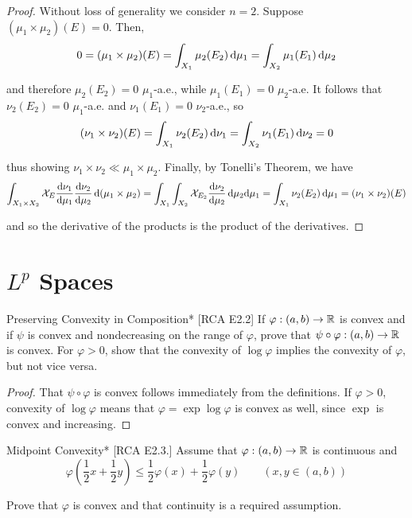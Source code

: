 \begin{proof}
    Without loss of generality we consider $n=2$. Suppose $(\mu_1 \times \mu_2)(E) = 0$. Then, 
    $$
        0 
        = (\mu_1 \times \mu_2)(E) 
        = \int_{X_1} \mu_2(E_2) \, \mathrm{d}\mu_1
        = \int_{X_2} \mu_1(E_1) \, \mathrm{d}\mu_2
    $$

    and therefore $\mu_2(E_2) = 0$ $\mu_1$-a.e., while $\mu_1(E_1) = 0$ $\mu_2$-a.e. It follows that $\nu_2(E_2) = 0$ $\mu_1$-a.e. and $\nu_1(E_1) = 0$ $\nu_2$-a.e., so 
    $$
        (\nu_1 \times \nu_2)(E) = \int_{X_1} \nu_2(E_2) \, \mathrm{d}\nu_1 = \int_{X_2} \nu_1(E_1) \, \mathrm{d}\nu_2 = 0
    $$

    thus showing $\nu_1 \times \nu_2 \ll \mu_1 \times \mu_2$. Finally, by Tonelli's Theorem, we have 
    $$
        \int_{X_1 \times X_2} \mathcal{X}_E \frac{\mathrm{d}\nu_1}{\mathrm{d}\mu_1} \frac{\mathrm{d}\nu_2}{\mathrm{d}\mu_2} \, \mathrm{d} (\mu_1 \times \mu_2)
        = \int_{X_1} \int_{X_2} \mathcal{X}_{E_2} \frac{\mathrm{d} \nu_2}{\mathrm{d} \mu_2} \, \mathrm{d} \mu_2 \mathrm{d}\mu_1 
        = \int_{X_1} \nu_2(E_2) \, \mathrm{d}\mu_1
        = (\nu_1 \times \nu_2)(E)
    $$

    and so the derivative of the products is the product of the derivatives. 
\end{proof}



\newpage
\section{$L^p$ Spaces}

\begin{problem}{Preserving Convexity in Composition}*
    [RCA E2.2] If $\varphi : (a, b) \to \mathbb{R}$ is convex and if $\psi$ is convex and nondecreasing on the range of $\varphi$, prove that $\psi \circ \varphi : (a, b) \to \mathbb{R}$ is convex. For $\varphi > 0$, show that the convexity of $\log\varphi$ implies the convexity of $\varphi$, but not vice versa. 
\end{problem}

\begin{proof}
    That $\psi \circ \varphi$ is convex follows immediately from the definitions. If $\varphi > 0$, convexity of $\log\varphi$ means that $\varphi = \exp \log \varphi$ is convex as well, since $\exp$ is convex and increasing. 
\end{proof}

\begin{problem}{Midpoint Convexity}*
    [RCA E2.3.] Assume that $\varphi: (a, b) \to \mathbb{R}$ is continuous and 
    $$
        \varphi \left(\frac{1}{2}x + \frac{1}{2}y\right) \leq \frac{1}{2} \varphi(x) + \frac{1}{2}\varphi(y)
        \qquad (x, y \in (a, b))
    $$

    Prove that $\varphi$ is convex and that continuity is a required assumption. 
\end{problem}

